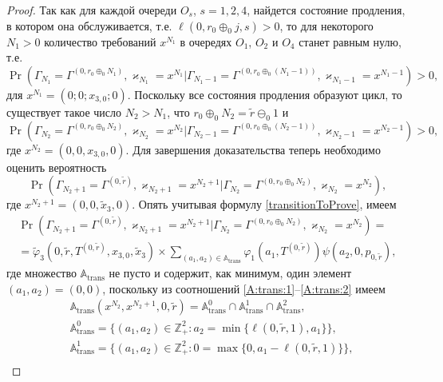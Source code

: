 \documentclass[a4paper,12pt,russian]{extarticle}
\begin{document}
\begin{proof}
Так как для каждой очереди $O_s$, $s=1,2,4$, найдется состояние продления, в котором она обслуживается, т.е. $\ell(0,r_0\oplus_{0}j,s)>0$, то для некоторого $N_1>0$ количество требований $x^{N_1}$ в очередях $O_1$, $O_2$ и $O_4$ станет равным нулю, т.е. 
\begin{equation*}
\Pr (\Gamma_{N_1}=\Gamma^{(0,r_0\oplus_{0}N_1)},\varkappa_{N_1}=x^{N_1} | \Gamma_{N_1-1}=\Gamma^{(0,r_0\oplus_{0}(N_1-1))},\varkappa_{N_1-1}=x^{N_1-1}) > 0,
\end{equation*}
для $x^{N_1}  =\left(0;0; x_{3,0};0\right)$. Поскольку все состояния продления образуют цикл, то существует такое число $N_2>N_1$, что $r_0 \oplus_0  N_2 = \tilde{r} \ominus_0 1$ и 
\begin{equation*}
\Pr (\Gamma_{N_2}=\Gamma^{(0,r_0\oplus_{0}N_2)},\varkappa_{N_2}=x^{N_2} | \Gamma_{N_2-1}=\Gamma^{(0,r_0\oplus_{0}(N_2-1))},\varkappa_{N_2-1}=x^{N_2-1}) > 0,
\end{equation*}
где $x^{N_2} = (0,0,x_{3,0},0)$.
Для завершения доказательства теперь необходимо оценить вероятность 
\begin{equation*}
\Pr (\Gamma_{N_2+1}=\Gamma^{(0,\tilde{r})},\varkappa_{N_2+1}= x^{N_2+1} | \Gamma_{N_2}=\Gamma^{(0,r_0\oplus_{0}N_2)},\varkappa_{N_2}=x^{N_2}),
\end{equation*}
где $x^{N_2+1} = (0,0,\tilde{x}_3,0)$.
Опять учитывая формулу \eqref{transitionToProve}, имеем
\begin{multline*}
\Pr (\Gamma_{N_2+1}=\Gamma^{(0,\tilde{r})},\varkappa_{N_2+1}=x^{N_2+1} | \Gamma_{N_2}=\Gamma^{(0,r_0\oplus_{0}N_2)},\varkappa_{N_2}=x^{N_2})=\\
=\widetilde{\varphi}_3(0,\tilde{r},T^{(0,\tilde{r})},x_{3,0},\tilde{x}_3)
\times
\sum_{(a_1,a_2)\in {\mathbb A}_{\mathrm{trans}}}\varphi_1(a_1,T^{(0,\tilde{r})})  \psi(a_2,0, p_{0,\tilde{r}}),
\end{multline*}
где множество ${\mathbb A}_{\mathrm{trans}}$ не пусто и содержит, как минимум, один элемент $(a_1,a_2)=(0,0)$, поскольку из соотношений \eqref{A:trans:1}--\eqref{A:trans:2} имеем
\begin{align*}
&{\mathbb A}_{\mathrm{trans}}(x^{N_2},x^{N_2+1},0,\tilde{r}) = {\mathbb A}_{\mathrm{trans}}^0 \cap {\mathbb A}_{\mathrm{trans}}^1\cap {\mathbb A}_{\mathrm{trans}}^2,\\
&{\mathbb A}_{\mathrm{trans}}^0 = \{(a_1,a_2) \in \mathbb{Z}_+^2 \colon a_2 = \min{\{\ell(0,\tilde{r},1), a_1}\} \},\\
&{\mathbb A}_{\mathrm{trans}}^1 = \{(a_1,a_2) \in \mathbb{Z}_+^2 \colon 0=\max{\{0,a_1-\ell(0,\tilde{r},1)\}}\},\\

\end{align*}
\end{proof}
\end{document}
